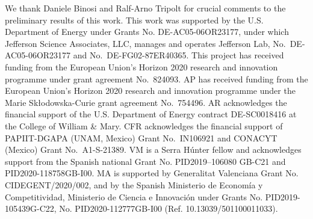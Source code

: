 \documentclass[10pt,aps,prd,amsmath,amssymb,superscriptaddress,onecolumn,nofootinbib,showpacs,preprintnumbers,amsfonts, notitlepage]{revtex4-1}
\begin{document}
\begin{acknowledgments}
We thank Daniele Binosi and Ralf-Arno Tripolt for crucial comments to the preliminary results of this work. 
This work was supported by the U.S. Department of Energy under Grants No. DE-AC05-06OR23177, under which Jefferson Science Associates, LLC, manages and operates Jefferson Lab, No.~DE-AC05-06OR23177 and No.~DE-FG02-87ER40365. 
This project has received funding from the European Union’s Horizon 2020 research and innovation programme under grant agreement No.~824093. %
AP has received funding from the European Union's Horizon 2020 research and innovation programme under the Marie Sk{\l}odowska-Curie grant agreement No.~754496. AR acknowledges the financial support of the U.S. Department of Energy contract DE-SC0018416 at the College of William \& Mary. 
CFR acknowledges the financial support of 
PAPIIT-DGAPA (UNAM, Mexico) Grant No.~IN106921 and
CONACYT (Mexico) Grant No.~A1-S-21389.
%
VM is a Serra Húnter fellow and acknowledges support from the Spanish national Grant No. PID2019–106080 GB-C21 and PID2020-118758GB-I00. %
%
MA is supported by Generalitat Valenciana Grant No. CIDEGENT/2020/002,
and by the Spanish Ministerio de Econom\'ia y Competitividad, Ministerio de Ciencia e Innovaci\'on under Grants No. PID2019-105439G-C22, No. PID2020-112777GB-I00 (Ref. 10.13039/501100011033). %

\end{acknowledgments}


\appendix












\newpage


\end{document}
